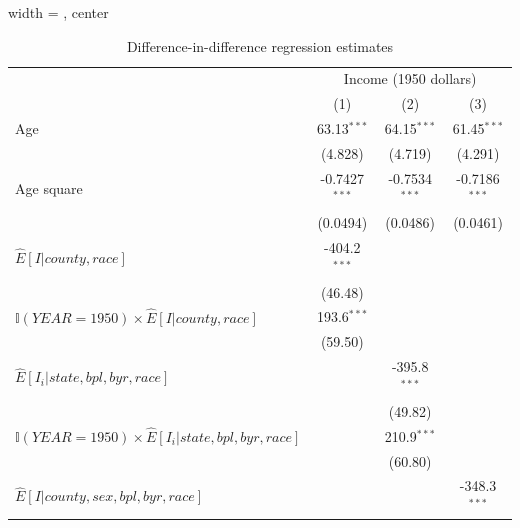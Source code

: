 \begin{table}[htbp]
   \caption{\label{tbl:regdid} Difference-in-difference regression estimates}
   \begin{adjustbox}{width = \textwidth, center}
      \begin{tabular}{lccc}
         \toprule
          & \multicolumn{3}{c}{Income (1950 dollars)}\\
                                                                      & (1)             & (2)             & (3)\\  
         \midrule 
         Age                                                     & 63.13$^{***}$   & 64.15$^{***}$   & 61.45$^{***}$\\   
                                                                      & (4.828)         & (4.719)         & (4.291)\\   
         Age square                                              & -0.7427$^{***}$ & -0.7534$^{***}$ & -0.7186$^{***}$\\   
                                                                      & (0.0494)        & (0.0486)        & (0.0461)\\   
         $\hat{E}[I|county,race]$                   & -404.2$^{***}$  &                 &   \\   
                                                                      & (46.48)         &                 &   \\   
         $\mathbb{I}(YEAR = 1950)\times\hat{E}[I|county,race]$                   & 193.6$^{***}$   &                 &   \\   
                                                                      & (59.50)         &                 &   \\   
         $\hat{E}[I_i|state, bpl, byr, race]$       &                 & -395.8$^{***}$  &   \\   
                                                                      &                 & (49.82)         &   \\   
         $\mathbb{I}(YEAR = 1950)\times\hat{E}[I_i|state, bpl, byr, race]$       &                 & 210.9$^{***}$   &   \\   
                                                                      &                 & (60.80)         &   \\   
         $\hat{E}[I|county, sex, bpl, byr, race]$   &                 &                 & -348.3$^{***}$\\   

\end{tabular}
\end{adjustbox}
\end{table}
